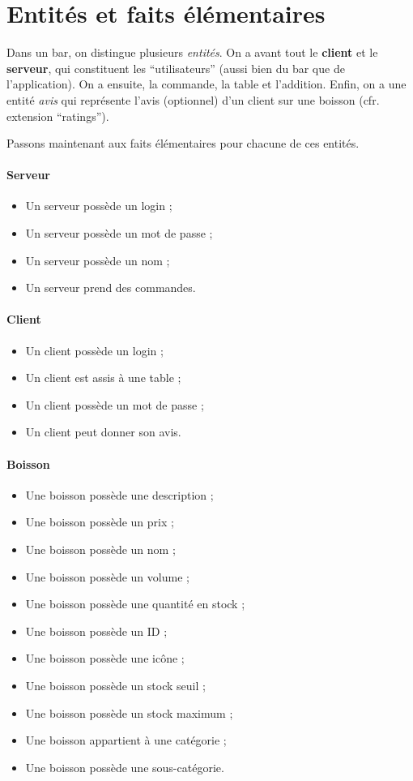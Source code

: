 
\section{Entités et faits élémentaires}
Dans un bar, on distingue plusieurs \textit{entités}.
On a avant tout le \textbf{client} et le \textbf{serveur}, qui
constituent les ``utilisateurs'' (aussi bien du bar que de
l'application). On a ensuite, la commande, la table et l'addition.
Enfin, on a une entité \textit{avis} qui représente l'avis (optionnel)
d'un client sur une boisson (cfr. extension ``ratings'').

Passons maintenant aux faits élémentaires pour chacune
de ces entités.

\paragraph{Serveur}
\begin{itemize}
	\item Un serveur possède un login ;
	\item Un serveur possède un mot de passe ;
	\item Un serveur possède un nom ;
	\item Un serveur prend des commandes.
\end{itemize}

\paragraph{Client}
\begin{itemize}
	\item Un client possède un login ;
	\item Un client est assis à une table ;
	\item Un client possède un mot de passe ;
	\item Un client peut donner son avis.
\end{itemize}

\paragraph{Boisson}
\begin{itemize}
	\item Une boisson possède une description ;
	\item Une boisson possède un prix ;
 	\item Une boisson possède un nom ;
	\item Une boisson possède un volume ;
	\item Une boisson possède une quantité en stock ;
	\item Une boisson possède un ID ;
	\item Une boisson possède une icône ;
	\item Une boisson possède un stock seuil ;
	\item Une boisson possède un stock maximum ;
	\item Une boisson appartient à une catégorie ;
	\item Une boisson possède une sous-catégorie.
\end{itemize}

